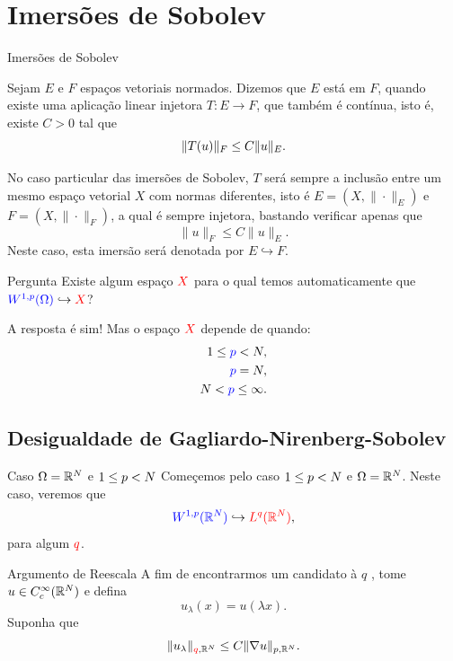 \section{Imersões de Sobolev}

\begin{frame}{Imersões de Sobolev}
	
\begin{defin}
	Sejam \(E\) e \(F\) espaços vetoriais normados. Dizemos que \(E\) está   em \(F\), quando existe uma aplicação linear {\color{red}injetora} \(T:E\longrightarrow F\), que também é contínua, isto é, existe \(C>0\) tal que
	\[\lVert T(u)\rVert_F\leq C \lVert u\rVert_E.\]
\end{defin}	

No caso particular das imersões de Sobolev, {\color{blue}\(T\) será sempre a inclusão} entre um mesmo espaço vetorial \(X\) com normas diferentes, isto é \(E=(X,\|\cdot \|_E)\) e \(F=(X,\|\cdot\|_F)\), a qual é sempre injetora, bastando verificar apenas que 
\[\|u\|_F\leq C\|u\|_E.\]	
Neste caso, esta imersão será denotada  por {\color{blue} \(E\hookrightarrow F\)}.

\end{frame}

\begin{frame}
\begin{exampleblock}{Pergunta}
Existe algum espaço  \({\color{red}X}\) para o qual temos automaticamente que  \({\color{blue}W^{1,p}(\Omega)}\hookrightarrow {\color{red} X }\)?
\end{exampleblock}	
A resposta é sim! Mas o espaço \({\color{red}X}\) depende de quando:
\begin{equation*}
	\begin{split}
1\leq {\color{blue}p}<N, \\ {\color{blue}p}=N, \\ N<{\color{blue}p}\leq \infty.
	\end{split}
\end{equation*}	
\end{frame}

\subsection*{Desigualdade de Gagliardo-Nirenberg-Sobolev}
\begin{frame}{Caso \(\Omega=\mathbb{R}^N\) e \(1\leq p<N\)}
	Começemos pelo caso \(1\leq p<N\) e \(\Omega=\mathbb{R}^N\). Neste caso, veremos que 
	\[{\color{blue}W^{1,p}(\mathbb{R}^N)}\hookrightarrow {\color{red} L^q(\mathbb{R}^N)},\]
para algum \({\color{red} q}\).

\begin{block}{Argumento de Reescala}
	A fim de encontrarmos um candidato à {\color{red} \(q\) }, tome \(u\in C^\infty_c(\mathbb{R}^N)\) e defina
	\[u_\lambda(x)=u(\lambda x).\]
	Suponha que 
	\[\lVert u_\lambda\rVert_{{\color{red} q },\mathbb{R}^N}\leq C \lVert\nabla u\rVert_{p,\mathbb{R}^N}.\]
\end{block}
\end{frame}

